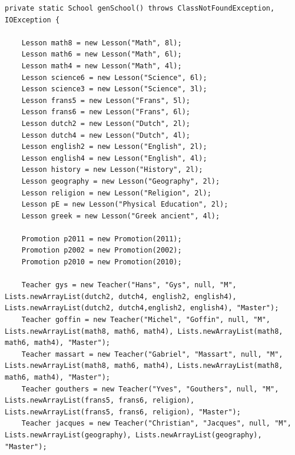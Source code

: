\documentclass[a4paper,fleqn,12pt]{report}
\begin{document}
\begin{lstlisting}
private static School genSchool() throws ClassNotFoundException, IOException {

    Lesson math8 = new Lesson("Math", 8l);
    Lesson math6 = new Lesson("Math", 6l);
    Lesson math4 = new Lesson("Math", 4l);
    Lesson science6 = new Lesson("Science", 6l);
    Lesson science3 = new Lesson("Science", 3l);
    Lesson frans5 = new Lesson("Frans", 5l);
    Lesson frans6 = new Lesson("Frans", 6l);
    Lesson dutch2 = new Lesson("Dutch", 2l);
    Lesson dutch4 = new Lesson("Dutch", 4l);
    Lesson english2 = new Lesson("English", 2l);
    Lesson english4 = new Lesson("English", 4l);
    Lesson history = new Lesson("History", 2l);
    Lesson geography = new Lesson("Geography", 2l);
    Lesson religion = new Lesson("Religion", 2l);
    Lesson pE = new Lesson("Physical Education", 2l);
    Lesson greek = new Lesson("Greek ancient", 4l);

    Promotion p2011 = new Promotion(2011);
    Promotion p2002 = new Promotion(2002);
    Promotion p2010 = new Promotion(2010);

    Teacher gys = new Teacher("Hans", "Gys", null, "M", Lists.newArrayList(dutch2, dutch4, english2, english4), Lists.newArrayList(dutch2, dutch4,english2, english4), "Master");
    Teacher goffin = new Teacher("Michel", "Goffin", null, "M", Lists.newArrayList(math8, math6, math4), Lists.newArrayList(math8, math6, math4), "Master");
    Teacher massart = new Teacher("Gabriel", "Massart", null, "M", Lists.newArrayList(math8, math6, math4), Lists.newArrayList(math8, math6, math4), "Master");
    Teacher gouthers = new Teacher("Yves", "Gouthers", null, "M", Lists.newArrayList(frans5, frans6, religion), Lists.newArrayList(frans5, frans6, religion), "Master");
    Teacher jacques = new Teacher("Christian", "Jacques", null, "M", Lists.newArrayList(geography), Lists.newArrayList(geography), "Master");


\end{lstlisting}
\end{document}

